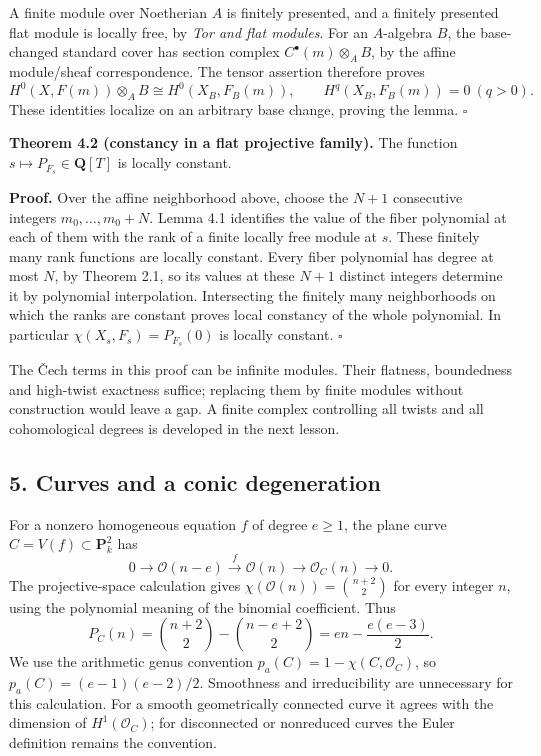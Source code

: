 \documentclass[11pt]{article}
\begin{document}
A finite module over Noetherian \(A\) is finitely presented, and a
finitely presented flat module is locally free, by \emph{Tor and flat
modules}. For an \(A\)-algebra \(B\), the base-changed standard cover
has section complex \(C^\bullet(m)\otimes_A B\), by the affine
module/sheaf correspondence. The tensor assertion therefore proves \[
H^0(X,F(m))\otimes_A B\cong H^0(X_B,F_B(m)),
\qquad H^q(X_B,F_B(m))=0\ (q>0).
\] These identities localize on an arbitrary base change, proving the
lemma. \(\square\)

\textbf{Theorem 4.2 (constancy in a flat projective family).} The
function \(s\mapsto P_{F_s}\in\mathbf Q[T]\) is locally constant.

\textbf{Proof.} Over the affine neighborhood above, choose the \(N+1\)
consecutive integers \(m_0,\ldots,m_0+N\). Lemma 4.1 identifies the
value of the fiber polynomial at each of them with the rank of a finite
locally free module at \(s\). These finitely many rank functions are
locally constant. Every fiber polynomial has degree at most \(N\), by
Theorem 2.1, so its values at these \(N+1\) distinct integers determine
it by polynomial interpolation. Intersecting the finitely many
neighborhoods on which the ranks are constant proves local constancy of
the whole polynomial. In particular \(\chi(X_s,F_s)=P_{F_s}(0)\) is
locally constant. \(\square\)

The Čech terms in this proof can be infinite modules. Their flatness,
boundedness and high-twist exactness suffice; replacing them by finite
modules without construction would leave a gap. A finite complex
controlling all twists and all cohomological degrees is developed in the
next lesson.

\subsection{5. Curves and a conic
degeneration}\label{curves-and-a-conic-degeneration}

For a nonzero homogeneous equation \(f\) of degree \(e\geq1\), the plane
curve \(C=V(f)\subset\mathbf P^2_k\) has \[
0\to\mathcal O(n-e)\xrightarrow{f}\mathcal O(n)\to\mathcal O_C(n)\to0.
\] The projective-space calculation gives
\(\chi(\mathcal O(n))=\binom{n+2}{2}\) for every integer \(n\), using
the polynomial meaning of the binomial coefficient. Thus \[
P_C(n)=\binom{n+2}{2}-\binom{n-e+2}{2}
=en-\frac{e(e-3)}2.
\] We use the arithmetic genus convention
\(p_a(C)=1-\chi(C,\mathcal O_C)\), so \(p_a(C)=(e-1)(e-2)/2\).
Smoothness and irreducibility are unnecessary for this calculation. For
a smooth geometrically connected curve it agrees with the dimension of
\(H^1(\mathcal O_C)\); for disconnected or nonreduced curves the Euler
definition remains the convention.
\end{document}
